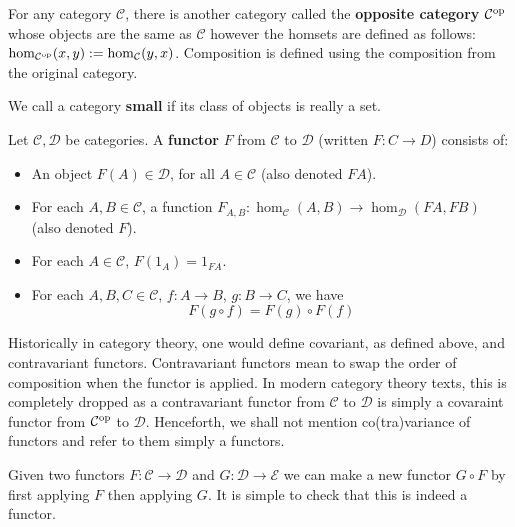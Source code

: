 \begin{example}
	For any category $\mathcal{C}$, there is another category called the {\bf opposite category} $\mathcal{C}^{\mathrm{op}}$ whose objects are the same as $\mathcal{C}$ however the homsets are defined as follows: $\hom_{\mathcal{C}^{\mathrm{op}}}(x,y):=\hom_{\mathcal{C}}(y,x)$. Composition is defined using the composition from the original category.
\end{example}

\begin{defin}
	We call a category {\bf small} if its class of objects is really a set.
\end{defin}

\begin{defin}
	Let $\mathcal{C},\mathcal{D}$ be categories. A {\bf functor} $F$ from $\mathcal{C}$ to $\mathcal{D}$ (written $F : C \to D$) consists of:
	
	\begin{itemize}
		\item An object $F(A)\in \mathcal{D}$, for all $A \in \mathcal{C}$ (also denoted $FA$).
		\item For each $A,B \in \mathcal{C}$, a function $F_{A,B} : \hom_{\mathcal{C}}(A,B) \to \hom_{\mathcal{D}}(FA,FB)$ (also denoted $F$).
		\item For each $A \in \mathcal{C}$, $F(1_A) = 1_{FA}$.
		\item For each $A,B,C \in \mathcal{C}$, $f : A \to B$, $g : B \to C$, we have $$F(g \circ f) = F(g)\circ F(f)$$
	\end{itemize}
\end{defin}

\begin{remark}
    Historically in category theory, one would define covariant, as defined above, and contravariant functors. Contravariant functors mean to swap the order of composition when the functor is applied. In modern category theory texts, this is completely dropped as a contravariant functor from $\mathcal{C}$ to $\mathcal{D}$ is simply a covaraint functor from $\mathcal{C}^{\mathrm{op}}$ to $\mathcal{D}$. Henceforth, we shall not mention co(tra)variance of functors and refer to them simply a functors.
\end{remark}

\begin{remark}
    Given two functors $F : \mathcal{C} \to \mathcal{D}$ and $G : \mathcal{D} \to \mathcal{E}$ we can make a new functor $G \circ F$ by first applying $F$ then applying $G$. It is simple to check that this is indeed a functor. 
\end{remark}

